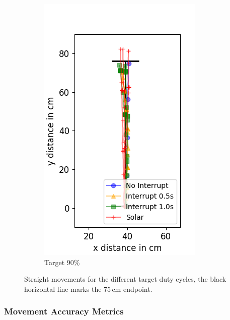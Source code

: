 \begin{figure}
\begin{subfigure}[b]{0.32\textwidth}
		\includegraphics[width=\textwidth]{pics/straight_90.png}
		\caption{Target 90\%}
		\label{fig:stra_exp3}
	\end{subfigure}
	\caption{Straight movements for the different target duty cycles, the black horizontal line marks the 75\,cm endpoint.}
	\label{fig:straight_movements}
\end{figure}

\subsubsection{Movement Accuracy Metrics}

